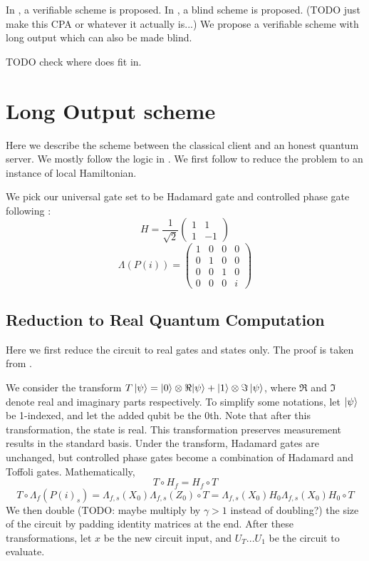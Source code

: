 \documentclass{article}
\theoremstyle{definition}
\begin{document}
In \cite{1804.01082}, a verifiable scheme is proposed. In \cite{1708.02130}, a blind scheme is proposed. (TODO just make this CPA or whatever it actually is...) We propose a verifiable scheme with long output which can also be made blind.

TODO check where does \cite{1904.06320} fit in.

\section{Long Output scheme}

Here we describe the scheme between the classical client and an honest quantum server. We mostly follow the logic in \cite{1804.01082}. We first follow \cite{quant-ph/0406180} to reduce the problem to an instance of local Hamiltonian.

We pick our universal gate set to be Hadamard gate and controlled phase gate following \cite{quant-ph/0301040}:
$$H=\frac{1}{\sqrt{2}}\begin{pmatrix}1&1\\1&-1\end{pmatrix}$$
$$\Lambda(P(i))=\begin{pmatrix}1&0&0&0\\0&1&0&0\\0&0&1&0\\0&0&0&i\end{pmatrix}$$

\subsection{Reduction to Real Quantum Computation}

Here we first reduce the circuit to real gates and states only. The proof is taken from \cite{quant-ph/0301040}.

We consider the transform $T\ket{\psi}=\ket{0}\otimes\Re|\psi\rangle+\ket{1}\otimes\Im\ket{\psi}$, where $\Re$ and $\Im$ denote real and imaginary parts respectively. To simplify some notations, let $\ket{\psi}$ be 1-indexed, and let the added qubit be the 0th. Note that after this transformation, the state is real. This transformation preserves measurement results in the standard basis. Under the transform, Hadamard gates are unchanged, but controlled phase gates become a combination of Hadamard and Toffoli gates. Mathematically,
$$T\circ H_f=H_f\circ T$$
$$T\circ\Lambda_f(P(i)_s)=\Lambda_{f,s}(X_0)\Lambda_{f,s}(Z_0)\circ T=\Lambda_{f,s}(X_0)H_0\Lambda_{f,s}(X_0)H_0\circ T$$
We then double (TODO: maybe multiply by $\gamma>1$ instead of doubling?) the size of the circuit by padding identity matrices at the end.
After these transformations, let $x$ be the new circuit input, and $U_T...U_1$ be the circuit to evaluate.
\end{document}
